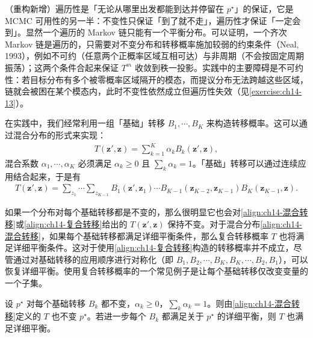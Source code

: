 \documentclass[../../main.tex]{subfiles}
\begin{document}
\begin{remark}（重构新增）遍历性是「无论从哪里出发都能到达并停留在 $p^{\star}$」的保证，它是 MCMC 可用性的另一半：不变性只保证「到了就不走」，遍历性才保证「一定会到」。显然一个遍历的 Markov 链只能有一个平衡分布。可以证明，一个齐次 Markov 链是遍历的，只需要对不变分布和转移概率施加较弱的约束条件（Neal, 1993），例如不可约（任意两个正概率区域互相可达）与非周期（不会按固定周期振荡）；这两个条件合起来保证 $T^{m}$ 收敛到秩一投影。实践中的主要障碍是不可约性：若目标分布有多个被零概率区域隔开的模态，而提议分布无法跨越这些区域，链就会被困在某个模态内，此时不变性依然成立但遍历性失效（见\cref{exercise:ch14-13}）。
\end{remark}

在实践中，我们经常利用一组「基础」转移 $B_{1},\cdots,B_{K}$ 来构造转移概率。这可以通过混合分布的形式来实现：
\begin{align}
T\!\left(\bm{z}',\bm{z}\right)=\sum_{k=1}^{K}\alpha_{k}B_{k}\!\left(\bm{z}',\bm{z}\right),
\label{align:ch14-混合转移}
\end{align}
混合系数 $\alpha_{1},\cdots,\alpha_{K}$ 必须满足 $\alpha_{k}\geqslant 0$ 且 $\sum_{k}\alpha_{k}=1$。「基础」转移可以通过连续应用结合起来，于是有
\begin{align}
T\!\left(\bm{z}',\bm{z}\right)=\sum_{z_{1}}\cdots\sum_{z_{K-1}}B_{1}\!\left(\bm{z}',\bm{z}_{1}\right)\cdots B_{K-1}\!\left(\bm{z}_{K-2},\bm{z}_{K-1}\right)B_{K}\!\left(\bm{z}_{K-1},\bm{z}\right).
\label{align:ch14-复合转移}
\end{align}

如果一个分布对每个基础转移都是不变的，那么很明显它也会对\eqref{align:ch14-混合转移}或\eqref{align:ch14-复合转移}给出的 $T\!\left(\bm{z}',\bm{z}\right)$ 保持不变。对于混合分布\eqref{align:ch14-混合转移}，如果每个基础转移都满足详细平衡条件，那么复合转移概率 $T$ 也将满足详细平衡条件。这对于使用\eqref{align:ch14-复合转移}构造的转移概率并不成立，尽管通过对基础转移的应用顺序进行对称化（即 $B_{1},B_{2},\cdots,B_{K},B_{K},\cdots,B_{2},B_{1}$），可以恢复详细平衡。使用复合转移概率的一个常见例子是让每个基础转移仅改变变量的一个子集。

\begin{proposition}[混合转移保持不变性]\label{proposition:ch14-混合转移不变}
设 $p^{\star}$ 对每个基础转移 $B_{k}$ 都不变，$\alpha_{k}\geqslant0$，$\sum_{k}\alpha_{k}=1$。则由\eqref{align:ch14-混合转移}定义的 $T$ 也不变 $p^{\star}$。若进一步每个 $B_{k}$ 都满足关于 $p^{\star}$ 的详细平衡，则 $T$ 也满足详细平衡。
\end{proposition}
\end{document}
